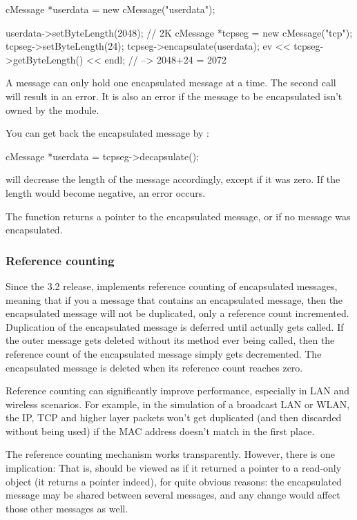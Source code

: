 \begin{cpp}
cMessage *userdata = new cMessage("userdata");

userdata->setByteLength(2048);  // 2K
cMessage *tcpseg = new cMessage("tcp");
tcpseg->setByteLength(24);
tcpseg->encapsulate(userdata);
ev << tcpseg->getByteLength() << endl; // --> 2048+24 = 2072
\end{cpp}

A message can only hold one encapsulated message at a time. The
second  call will result in an error. It is also
an error if the message to be encapsulated isn't owned by the
module.

You can get back the encapsulated message by :

\begin{cpp}
cMessage *userdata = tcpseg->decapsulate();
\end{cpp}

 will decrease the length of the message accordingly,
except if it was zero. If the length would become negative, an
error occurs.

The  function returns a pointer to the encapsulated
message, or  if no message was encapsulated.

\subsubsection{Reference counting}

Since the 3.2 release, {\opp} implements reference counting of
encapsulated messages, meaning that if you  a message
that contains an encapsulated message, then the encapsulated message will
not be duplicated, only a reference count incremented. Duplication of
the encapsulated message is deferred until 
actually gets called. If the outer message gets deleted without its
 method ever being called, then the reference
count of the encapsulated message simply gets decremented. The
encapsulated message is deleted when its reference count reaches
zero.

Reference counting can significantly improve performance, especially
in LAN and wireless scenarios. For example, in the simulation of a
broadcast LAN or WLAN, the IP, TCP and higher layer packets won't
get duplicated (and then discarded without being used) if the
MAC address doesn't match in the first place.

The reference counting mechanism works transparently. However, there
is one implication:  That is,
 should be viewed as if it returned a
pointer to a read-only object (it returns a  pointer
indeed), for quite obvious reasons: the encapsulated message may be
shared between several messages, and any change would affect those
other messages as well.


